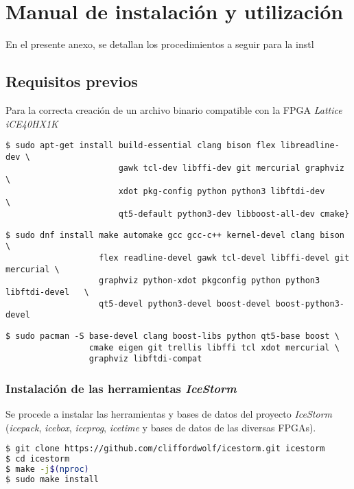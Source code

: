 \chapter{Manual de instalación y utilización}
\label{ch:manual}

En el presente anexo, se detallan los procedimientos a seguir para la instl

\section{Requisitos previos}
Para la correcta creación de un archivo binario compatible con la FPGA \emph{Lattice iCE40HX1K}

\begin{verbatim}
$ sudo apt-get install build-essential clang bison flex libreadline-dev \
                       gawk tcl-dev libffi-dev git mercurial graphviz   \
                       xdot pkg-config python python3 libftdi-dev       \
                       qt5-default python3-dev libboost-all-dev cmake}
\end{verbatim}
\begin{verbatim}
$ sudo dnf install make automake gcc gcc-c++ kernel-devel clang bison            \
                   flex readline-devel gawk tcl-devel libffi-devel git mercurial \
                   graphviz python-xdot pkgconfig python python3 libftdi-devel   \
                   qt5-devel python3-devel boost-devel boost-python3-devel
\end{verbatim}
\begin{verbatim}
$ sudo pacman -S base-devel clang boost-libs python qt5-base boost \
                 cmake eigen git trellis libffi tcl xdot mercurial \
                 graphviz libftdi-compat 
\end{verbatim}

\subsection{Instalación de las herramientas \emph{IceStorm}}
Se procede a instalar las herramientas y bases de datos del proyecto \emph{IceStorm} (\emph{icepack}, \emph{icebox}, \emph{iceprog}, \emph{icetime} y bases de datos de las diversas FPGAs).

\begin{lstlisting}[language=bash]
$ git clone https://github.com/cliffordwolf/icestorm.git icestorm
$ cd icestorm
$ make -j$(nproc)
$ sudo make install
\end{lstlisting}


